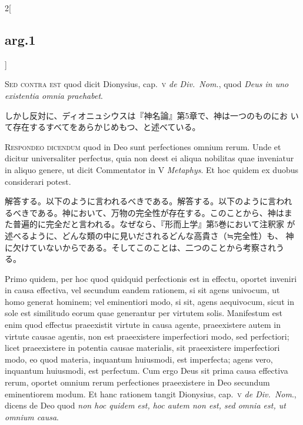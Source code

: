 \documentclass[paper=a4paper,fontsize=10pt,jafontsize=9pt,titlepage]{jlreq}
\begin{document}
\begin{paracol}{2}[\subsection{arg.1}]
\switchcolumn*[\subsection{s.c.}]

{\scshape Sed contra est} quod dicit Dionysius, cap.~{\scshape v}
 {\itshape de Div.~Nom.}, quod {\itshape Deus in uno existentia omnia
 praehabet}.

\switchcolumn

しかし反対に、ディオニュシウスは『神名論』第5章で、神は一つのものにお
いて存在するすべてをあらかじめもつ、と述べている。


{\scshape Respondeo dicendum} quod in Deo sunt perfectiones omnium
rerum. Unde et dicitur universaliter perfectus, quia non deest ei
aliqua nobilitas quae inveniatur in aliquo genere, ut dicit
Commentator in V {\itshape Metaphys}. Et hoc quidem ex duobus
considerari potest.

\switchcolumn

解答する。以下のように言われるべきである。解答する。以下のように言われ
るべきである。神において、万物の完全性が存在する。このことから、神はま
た普遍的に完全だと言われる。なぜなら、『形而上学』第5巻において注釈家
が述べるように、どんな類の中に見いだされるどんな高貴さ（≒完全性）も、
神に欠けていないからである。そしてこのことは、二つのことから考察されう
る。

\switchcolumn*

Primo quidem, per hoc quod quidquid perfectionis est in effectu,
oportet inveniri in causa effectiva, vel secundum eandem rationem, si
sit agens univocum, ut homo generat hominem; vel eminentiori modo, si
sit, agens aequivocum, sicut in sole est similitudo eorum quae
generantur per virtutem solis.  Manifestum est enim quod effectus
praeexistit virtute in causa agente, praeexistere autem in virtute
causae agentis, non est praeexistere imperfectiori modo, sed
perfectiori; licet praeexistere in potentia causae materialis, sit
praeexistere imperfectiori modo, eo quod materia, inquantum huiusmodi,
est imperfecta; agens vero, inquantum huiusmodi, est perfectum. Cum
ergo Deus sit prima causa effectiva rerum, oportet omnium rerum
perfectiones praeexistere in Deo secundum eminentiorem modum. Et hanc
rationem tangit Dionysius, cap.~{\scshape v} {\itshape de Div.~Nom}.,
dicens de Deo quod {\itshape non hoc quidem est, hoc autem non est,
sed omnia est, ut omnium causa}.


\end{paracol}
\end{document}
